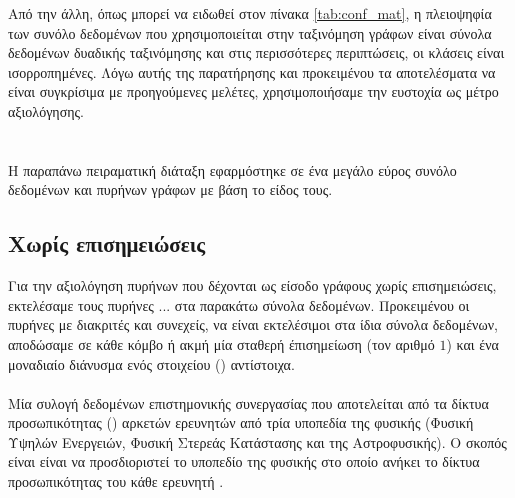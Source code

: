 \begin{table}[]
\centering
{}
\caption{Πίνακας σύγχησης για ένα πρόβλημα δυαδικής ταξινόμησης.}
\label{tab:conf_mat}
\end{table}
Από την άλλη, όπως μπορεί να ειδωθεί στον πίνακα \ref{tab:conf_mat}, η πλειοψηφία των συνόλο δεδομένων που χρησιμοποιείται στην ταξινόμηση γράφων είναι σύνολα δεδομένων δυαδικής ταξινόμησης και στις περισσότερες περιπτώσεις, οι κλάσεις είναι ισορροπημένες.
Λόγω αυτής της παρατήρησης και προκειμένου τα αποτελέσματα να είναι συγκρίσιμα με προηγούμενες μελέτες, χρησιμοποιήσαμε την ευστοχία ως μέτρο αξιολόγησης.
\section{}
Η παραπάνω πειραματική διάταξη εφαρμόστηκε σε ένα μεγάλο εύρος συνόλο δεδομένων και πυρήνων γράφων με βάση το είδος τους.
\subsection{Χωρίς επισημειώσεις}
Για την αξιολόγηση πυρήνων που δέχονται ως είσοδο γράφους χωρίς επισημειώσεις, εκτελέσαμε τους πυρήνες ... στα παρακάτω σύνολα δεδομένων.
Προκειμένου οι πυρήνες με διακριτές και συνεχείς, να είναι εκτελέσιμοι στα ίδια σύνολα δεδομένων, αποδώσαμε σε κάθε κόμβο ή ακμή μία σταθερή έπισημείωση (τον αριθμό $1$) και ένα μοναδιαίο διάνυσμα ενός στοιχείου () αντίστοιχα.
\paragraph*{} Μία συλογή δεδομένων επιστημονικής συνεργασίας που αποτελείται από τα δίκτυα προσωπικότητας () αρκετών ερευνητών από τρία υποπεδία της φυσικής (Φυσική Υψηλών Ενεργειών, Φυσική Στερεάς Κατάστασης και της Αστροφυσικής).
Ο σκοπός είναι είναι να προσδιοριστεί το υποπεδίο της φυσικής στο οποίο ανήκει το  δίκτυα προσωπικότητας του κάθε ερευνητή \cite{DGK_PINAR}.


